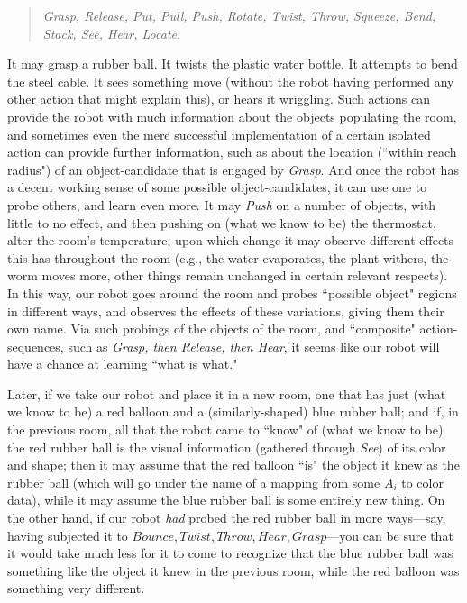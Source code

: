 \documentclass[a4paper]{book}
\theoremstyle{definition}
\theoremstyle{definition}
\theoremstyle{definition}
\theoremstyle{theorem}
\theoremstyle{definition}
\begin{document}
\begin{quote}
	\textit{Grasp, Release, Put, Pull, Push, Rotate, Twist, Throw, Squeeze, Bend, Stack, See, Hear, Locate}.   
\end{quote}  
It may grasp a rubber ball. It twists the plastic water bottle. It attempts to bend the steel cable. It sees something move (without the robot having performed any other action that might explain this), or hears it wriggling. Such actions can provide the robot with much information about the objects populating the room, and sometimes even the mere successful implementation of a certain isolated action can provide further information, such as about the location (``within reach radius") of an object-candidate that is engaged by \textit{Grasp}. And once the robot has a decent working sense of some possible object-candidates, it can use one to probe others, and learn even more. It may \textit{Push} on a number of objects, with little to no effect, and then pushing on (what we know to be) the thermostat, alter the room's temperature, upon which change it may observe different effects this has throughout the room (e.g., the water evaporates, the plant withers, the worm moves more, other things remain unchanged in certain relevant respects). In this way, our robot goes around the room and probes ``possible object" regions in different ways, and observes the effects of these variations, giving them their own name. Via such probings of the objects of the room, and ``composite" action-sequences, such as \textit{Grasp, then Release, then Hear}, it seems like our robot will have a chance at learning ``what is what." \par  
Later, if we take our robot and place it in a new room, one that has just (what we know to be) a red balloon and a (similarly-shaped) blue rubber ball; and if, in the previous room, all that the robot came to ``know" of (what we know to be) the red rubber ball is the visual information (gathered through \textit{See}) of its color and shape; then it may assume that the red balloon ``is" the object it knew as the rubber ball (which will go under the name of a mapping from some $A_i$ to color data), while it may assume the blue rubber ball is some entirely new thing. On the other hand, if our robot \textit{had} probed the red rubber ball in more ways---say, having subjected it to $Bounce, Twist, Throw, Hear, Grasp$---you can be sure that it would take much less for it to come to recognize that the blue rubber ball was something like the object it knew in the previous room, while the red balloon was something very different. \par  
\end{document}
